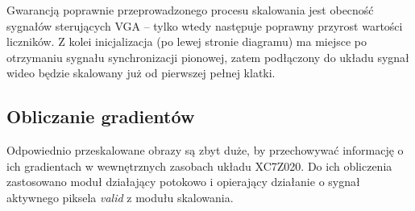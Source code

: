 Gwarancją poprawnie przeprowadzonego procesu skalowania jest obecność sygnałów sterujących VGA -- tylko wtedy następuje poprawny przyrost wartości liczników. 
Z kolei inicjalizacja (po lewej stronie diagramu) ma miejsce po otrzymaniu sygnału synchronizacji pionowej, zatem podłączony do układu sygnał wideo będzie skalowany już od pierwszej pełnej klatki.


\subsection{Obliczanie gradientów}

Odpowiednio przeskalowane obrazy są zbyt duże, by przechowywać informację o ich gradientach w wewnętrznych zasobach układu XC7Z020. Do ich obliczenia zastosowano moduł działający potokowo i opierający działanie o sygnał aktywnego piksela \textit{valid} z modułu skalowania. 

